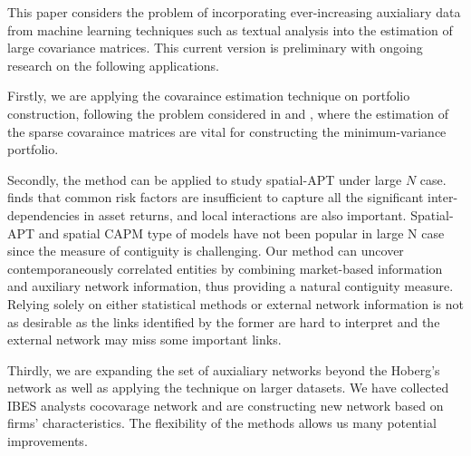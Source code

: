 This paper considers the problem of incorporating ever-increasing auxialiary data from machine learning techniques such as textual analysis into the estimation of large covariance matrices. 
This current version is preliminary with ongoing research on the following  applications.

Firstly, we are applying the covaraince estimation technique on portfolio construction, following the problem considered in \cite{ledoit2004HoneyShrunk} and \cite{ledoit2017NonlinearShrinkage}, where the estimation of the sparse covaraince matrices are vital for constructing the minimum-variance portfolio. 

Secondly, the method can be applied to study spatial-APT under large \(N\) case. \cite{kou2018asset} finds that common risk factors are insufficient to capture all the significant inter-dependencies in asset returns, and local interactions are also important.  Spatial-APT and spatial CAPM type of models have not been popular in large N case since the measure of contiguity is challenging. Our method can uncover contemporaneously correlated entities by combining market-based information and auxiliary network information, thus providing a natural contiguity measure. Relying solely on either statistical methods or external network information is not as desirable as the links identified by the former are hard to interpret and the external network may miss some important links.

Thirdly, we are expanding the set of auxialiary networks beyond the Hoberg's network as well as applying the technique on larger datasets. We have collected IBES analysts cocovarage network and are constructing new network based on firms' characteristics. The flexibility of the methods allows us many potential improvements. 